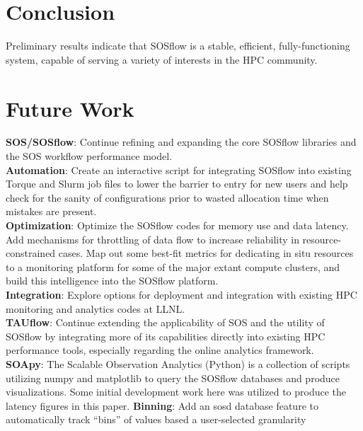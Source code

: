 
\section{Conclusion}
%
Preliminary results indicate that SOSflow is a stable, efficient,
fully-functioning system, capable of serving a variety of interests in
the HPC community. 


\section{Future Work} %
%
\textbf{SOS/SOSflow}: Continue refining and expanding the core SOSflow
libraries and the SOS workflow performance model.
\\
\textbf{Automation}: Create an interactive script for integrating
SOSflow into existing Torque and Slurm job files to lower the barrier
to entry for new users and help check for the sanity of configurations
prior to wasted allocation time when mistakes are present.
\\
\textbf{Optimization}: Optimize the SOSflow codes for memory use
and data latency. Add mechanisms for throttling of data flow to
increase reliability in resource-constrained cases. Map out some
best-fit metrics for dedicating in situ resources to a monitoring
platform for some of the major extant compute clusters, and build this
intelligence into the SOSflow platform.
\\
\textbf{Integration}: Explore options for deployment and integration with
existing HPC monitoring and analytics codes at LLNL.
\\
\textbf{TAUflow}: Continue extending the applicability of SOS and
the utility of SOSflow by integrating more of its capabilities
directly into existing HPC performance tools, especially regarding the
online analytics framework.
\\
\textbf{SOApy}: The Scalable Observation Analytics (Python) is a
collection of scripts utilizing numpy and matplotlib to query the
SOSflow databases and produce visualizations. Some initial development
work here was utilized to produce the latency figures in this paper.
%
\textbf{Binning}: Add an sosd database feature to automatically
track ``bins'' of values based a user-selected granularity
